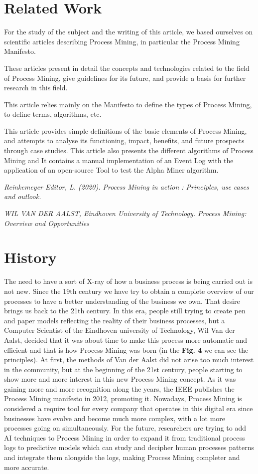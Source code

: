 \documentclass[conference]{IEEEtran}
\begin{document}
\section{Related Work}

For the study of the subject and the writing of this article, we based ourselves on scientific articles describing Process Mining, in particular the Process Mining Manifesto.

These articles present in detail the concepts and technologies related to the field of Process Mining, give guidelines for its future, and provide a basis for further research in this field.

This article relies mainly on the Manifesto to define the types of Process Mining, to define terms, algorithms, etc.

This article provides simple definitions of the basic elements of Process Mining, and attempts to analyse its functioning, impact, benefits, and future prospects through case studies.
This article also presents the different algorithms of Process Mining and It contains a manual implementation of an Event Log with the application of an open-source Tool to test the Alpha Miner algorithm.

\textit{Reinkemeyer Editor, L. (2020). Process Mining in action : Principles, use cases and outlook.}

\textit{WIL VAN DER AALST, Eindhoven University of Technology. Process Mining: Overview and Opportunities}

\section{History}
The need to have a sort of X-ray of how a business process is being carried out is not new. Since the 19th century we have try to obtain a complete overview of our processes to have a better understanding of the business we own.
That desire brings us back to the 21th century. In this era, people still trying to create pen and paper models reflecting the reality of their business processes, but a Computer Scientist of the Eindhoven university of Technology, Wil Van der Aalst, decided that it was about time to make this process more automatic and efficient and that is how Process Mining was born (in the \textbf{Fig. 4} we can see the principles).
At first, the methods of Van der Aalst did not arise too much interest in the community, but at the beginning of the 21st century, people starting to show more and more interest in this new Process Mining concept.
As it was gaining more and more recognition along the years, the IEEE publishes the Process Mining manifesto in 2012, promoting it.
Nowadays, Process Mining is considered a require tool for every company that operates in this digital era since businesses have evolve and become much more complex, with a lot more processes going on simultaneously.
For the future, researchers are trying to add AI techniques to Process Mining in order to expand it from traditional process logs to predictive models which can study and decipher human processes patterns and integrate them alongside the logs, making Process Mining completer and more accurate.
\end{document}
